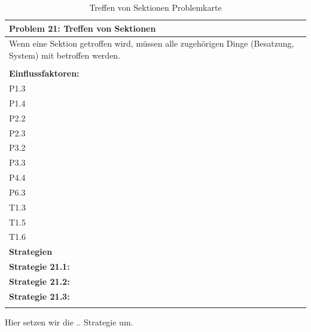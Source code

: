 \documentclass[fontsize=12pt,paper=a4,twoside]{scrartcl}
\begin{document}
\begin{table}[H]
    \centering
    \begin{tabular}{|p{15cm}|}
    \hline
          \textbf{Problem 21: Treffen von Sektionen}  \\ \hline
	Wenn eine Sektion getroffen wird, müssen alle zugehörigen Dinge (Besatzung, System) mit betroffen werden. \\
         \\ \hline
          \textbf{Einflussfaktoren: } \\
	P1.3\\
	P1.4 \\
	P2.2 \\
	P2.3 \\
	P3.2 \\
	P3.3 \\
	P4.4 \\
	P6.3 \\
	T1.3 \\
	T1.5 \\
	T1.6 \\
          \hline
          \textbf{Strategien} \\ \hline
            {}          
           \label{strategie:21.1}     
          \textbf{Strategie 21.1:}  \\        
  {}          
           \label{strategie:21.2}              
          \textbf{Strategie 21.2:}  \\
	 {}          
           \label{strategie:21.3}     
          \textbf{Strategie 21.3: }  \\ 
	 \\ \hline
    \end{tabular}

    \caption{Treffen von Sektionen Problemkarte}
    \label{tab:ProblemKarte21}
\end{table}
Hier setzen wir die .. Strategie um. \\
\end{document}
